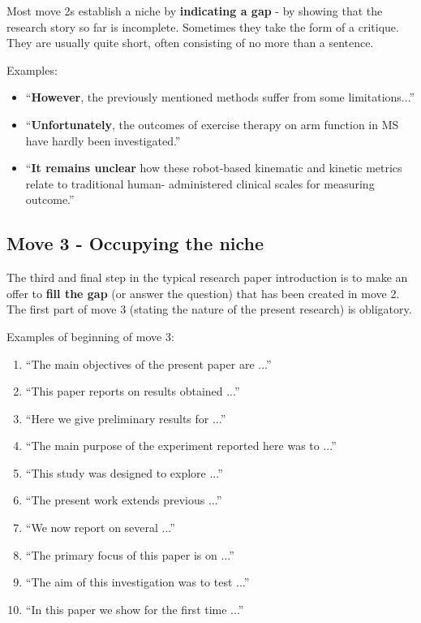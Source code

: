 Most move 2s establish a niche by \textbf{indicating a gap} - by showing that the research story so far is incomplete. Sometimes they take the form of a critique. They are usually quite short, often consisting of no more than a sentence.

Examples:
\begin{itemize}
	\item ``\textbf{However}, the previously mentioned methods suffer from some limitations...''
	\item ``\textbf{Unfortunately}, the outcomes of exercise therapy on arm function in MS have hardly been investigated.''
	\item ``\textbf{It remains unclear} how these robot-based kinematic and kinetic metrics relate to traditional human- administered clinical scales for measuring outcome.''
\end{itemize}

\subsection{Move 3 - Occupying the niche}

The third and final step in the typical research paper introduction is to make an offer to \textbf{fill the gap} (or answer the question) that has been created in move 2. The first part of move 3 (stating the nature of the present research) is obligatory.

Examples of beginning of move 3:
\begin{enumerate}
	\item ``The main objectives of the present paper are ...''
	\item ``This paper reports on results obtained ...''
	\item ``Here we give preliminary results for ...''
	\item ``The main purpose of the experiment reported here was to ...''
	\item ``This study was designed to explore ...''
	\item ``The present work extends previous ...''
	\item ``We now report on several ...''
	\item ``The primary focus of this paper is on ...''
	\item ``The aim of this investigation was to test ...''
	\item ``In this paper we show for the first time ...''
\end{enumerate}


